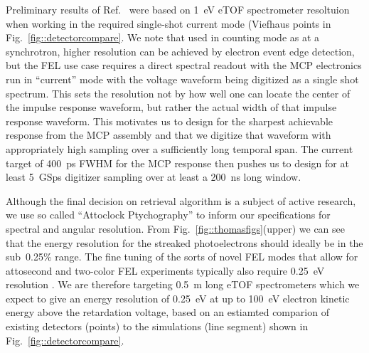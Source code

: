 Preliminary results of Ref.~\cite{Nick2018} were based on 1~eV eTOF spectrometer resoltuion when working in the required single-shot current mode (Viefhaus points in Fig.~\ref{fig::detectorcompare}.
We note that used in counting mode as at a synchrotron, higher resolution can be achieved by electron event edge detection, but the FEL use case requires a direct spectral readout with the MCP electronics run in ``current'' mode with the voltage waveform being digitized as a single shot spectrum.
This sets the resolution not by how well one can locate the center of the impulse response waveform, but rather the actual width of that impulse response waveform.
This motivates us to design for the sharpest achievable response from the MCP assembly and that we digitize that waveform with appropriately high sampling over a sufficiently long temporal span.
The current target of 400~ps FWHM for the MCP response then pushes us to design for at least 5~GSps digitizer sampling over at least a 200~ns long window.

Although the final decision on retrieval algorithm is a subject of active research, we use so called ``Attoclock Ptychography'' \cite{Feurer2018} to inform our specifications for spectral and angular resolution.
From Fig.~\ref{fig::thomasfigs}(upper) we can see that the energy resolution for the streaked photoelectrons should ideally be in the sub~0.25\% range.
The fine tuning of the sorts of novel FEL modes that allow for attosecond \cite{xLEAP} and two-color \cite{LutmanFreshSlice2016} FEL experiments typically also require 0.25~eV resolution \cite{AlbertoPrivate}.
We are therefore targeting 0.5~m long eTOF spectrometers which we expect to give an energy resolution of 0.25~eV at up to 100~eV electron kinetic energy above the retardation voltage, based on an estiamted comparion of existing detectors (points) to the simulations (line segment) shown in Fig.~\ref{fig::detectorcompare}.

